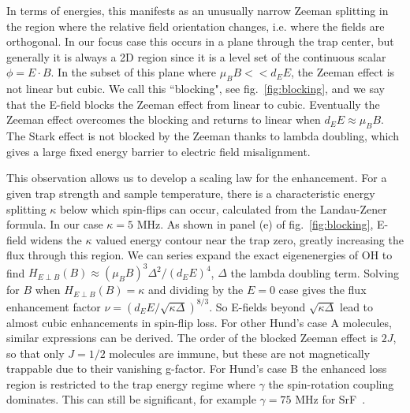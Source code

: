 \documentclass[%
 reprint,
groupedaddress,
 amsmath,amssymb,
 aps,
prl,
]{revtex4-1}
\newcommand{\epb}{$E\!\perp\!B$}
\newcommand{\epbm}{{E\!\perp\!B}}
\begin{document}
In terms of energies, this manifests as an unusually narrow Zeeman splitting in the region where the relative field orientation changes, i.e. where the fields are orthogonal. In our focus case this occurs in a plane through the trap center, but generally it is always a 2D region since it is a level set of the continuous scalar $\phi = E\cdot B$. In the subset of this plane where $\mu_BB<<d_EE$, the Zeeman effect is not linear but cubic. We call this ``blocking", see fig.~\ref{fig:blocking}, and we say that the E-field blocks the Zeeman effect from linear to cubic. Eventually the Zeeman effect overcomes the blocking and returns to linear when $d_EE\approx\mu_BB$. The Stark effect is not blocked by the Zeeman thanks to lambda doubling, which gives a large fixed energy barrier to electric field misalignment.

This observation allows us to develop a scaling law for the enhancement. For a given trap strength and sample temperature, there is a characteristic energy splitting $\kappa$ below which spin-flips can occur, calculated from the Landau-Zener formula. In our case $\kappa=5\text{ MHz}$. As shown in panel (e) of fig.~\ref{fig:blocking}, E-field widens the $\kappa$ valued energy contour near the trap zero, greatly increasing the flux through this region. We can series expand the exact eigenenergies of OH to find $H_\epbm(B)\approx (\mu_BB)^3\Delta^2/(d_EE)^4$, $\Delta$ the lambda doubling term. Solving for $B$ when $H_\epbm(B)=\kappa$ and dividing by the $E=0$ case gives the flux enhancement factor $\nu = (d_EE/\sqrt{\kappa\Delta})^{8/3}$. So E-fields beyond $\sqrt{\kappa\Delta}$ lead to almost cubic enhancements in spin-flip loss. For other Hund's case A molecules, similar expressions can be derived. The order of the blocked Zeeman effect is $2J$, so that only $J=1/2$ molecules are immune, but these are not magnetically trappable due to their vanishing g-factor. For Hund's case B the enhanced loss region is restricted to the trap energy regime where $\gamma$ the spin-rotation coupling dominates. This can still be significant, for example $\gamma=75\text{ MHz}$ for SrF~\cite{Quemener2016}. 


\end{document}
